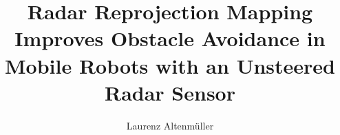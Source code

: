 \documentclass[%
    fontsize=12pt,
    headinclude,
    paper=a4,
    numbers=noenddot,
    listof=totoc,
    bibliography=totoc,
    index=totoc,
]{diplomarbeit}
\title{Radar Reprojection Mapping Improves Obstacle Avoidance in Mobile Robots with an Unsteered Radar Sensor}
\author{Laurenz Altenmüller}
\begin{document}
\maketitle

\renewcommand{\thepage}{}
\cleardoublepage 



\pagestyle{empty}
\cleardoublepage 
\setcounter{page}{3}	%
\renewcommand{\thepage}{\roman{page}}

\pagestyle{headings}
\tableofcontents





\newpage{\pagestyle{plain}\cleardoublepage}
\rmfamily
\renewcommand{\thepage}{\arabic{page}}
\setcounter{page}{1}



\clearpage
\begin{appendix}

% 
% 


\end{appendix}

\listoffigures
\listoftables

\clearpage
\printindex

\clearpage
\printbibliography
\end{document}
